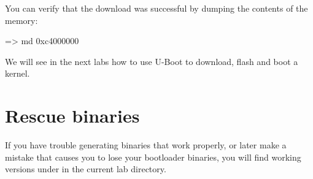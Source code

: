 You can verify that the download was successful by dumping the
contents of the memory:

\begin{ubootinput}
=> md 0xc4000000
\end{ubootinput}

We will see in the next labs how to use U-Boot to download, flash and
boot a kernel.

\section{Rescue binaries}

If you have trouble generating binaries that work properly, or later
make a mistake that causes you to lose your bootloader binaries, you
will find working versions under  in the current lab
directory.
